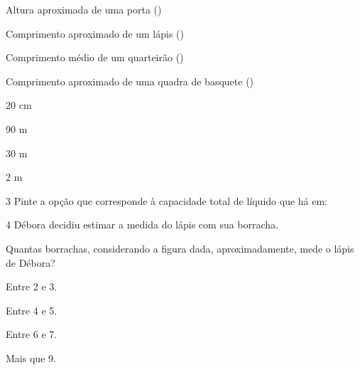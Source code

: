 {\begin{multicols}{2}
Altura aproximada de uma porta ()

Comprimento aproximado de um lápis (\coment{20 cm})

Comprimento médio de um quarteirão ()

Comprimento aproximado de uma quadra de basquete ()

\columnbreak

20 cm
 
90 m

30 m
 
2 m
\end{multicols}


\num{3} Pinte a opção que corresponde à capacidade total de líquido que
há em:



\num{4} Débora decidiu estimar a medida do lápis com sua borracha.


Quantas borrachas, considerando a figura dada, aproximadamente, mede o
lápis de Débora?

\begin{escolha}
\item
  Entre 2 e 3.
\item
  Entre 4 e 5.
\item
  Entre 6 e 7.
\item
  Mais que 9.
\end{escolha}

}
